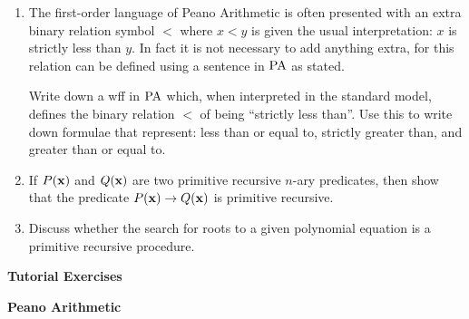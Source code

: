 \documentclass[11pt]{report}
\begin{document}
\begin{enumerate}

	\item The first-order language of Peano Arithmetic is often presented with an extra binary relation symbol $<$ where $x < y$ is given the usual interpretation: $x$ is strictly less than $y$. In fact it is not necessary to add anything extra, for this relation can be defined using a sentence in $\text{PA}$ as stated. 
	
	Write down a wff in $\text{PA}$ which, when interpreted in the standard model, defines the binary relation $<$ of being ``strictly less than''. Use this to write down formulae that represent: less than or equal to, strictly greater than, and greater than or equal to. 


	\vspace{2cm}

	\item If $P({\bf x})$ and $Q({\bf x})$ are two primitive recursive $n$-ary predicates, then show that the predicate $P({\bf x})\to Q({\bf x})$ is primitive recursive. 
	

	\vspace{2cm}

	

	\vspace{3cm}

	\item Discuss whether the search for roots to a given polynomial equation is a primitive recursive procedure.
	

\end{enumerate}	

\newpage
{\bf Tutorial Exercises}

\begin{center}
	{\bf Peano Arithmetic}
\end{center}
\end{document}
